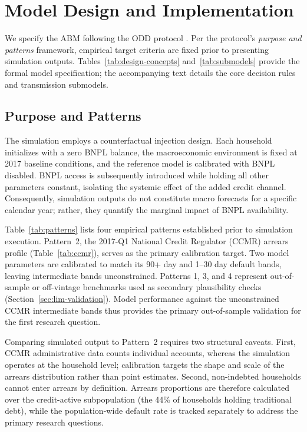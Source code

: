 \section{Model Design and Implementation}
\label{ch:model}

We specify the \ac{ABM} following the \ac{ODD} protocol \cite{grimm2006odd,
grimm2020odd}. Per the protocol's \emph{purpose and patterns} framework, empirical target criteria are fixed prior to presenting simulation outputs.
Tables~\ref{tab:design-concepts} and~\ref{tab:submodels} provide the formal model specification; the accompanying text details the core decision rules and transmission submodels.

\subsection{Purpose and Patterns}
\label{sec:purpose}

The simulation employs a counterfactual injection design.
Each household initializes with a zero \ac{BNPL} balance, the macroeconomic environment is fixed at 2017 baseline conditions, and the reference model is calibrated with \ac{BNPL} disabled.
\ac{BNPL} access is subsequently introduced while holding all other parameters constant, isolating the systemic effect of the added credit channel.
Consequently, simulation outputs do not constitute macro forecasts for a specific calendar year; rather, they quantify the marginal impact of \ac{BNPL} availability.

Table~\ref{tab:patterns} lists four empirical patterns established prior to simulation execution. Pattern~2, the 2017-Q1 National Credit Regulator (\ac{CCMR}) arrears profile (Table~\ref{tab:ccmr}), serves as the primary calibration target.
Two model parameters are calibrated to match its 90+ day and 1--30 day default bands, leaving intermediate bands unconstrained.
Patterns 1, 3, and 4 represent out-of-sample or off-vintage benchmarks used as secondary plausibility checks (Section~\ref{sec:lim-validation}).
Model performance against the unconstrained \ac{CCMR} intermediate bands thus provides the primary out-of-sample validation for the first research question.

Comparing simulated output to Pattern~2 requires two structural caveats.
First, \ac{CCMR} administrative data counts individual accounts, whereas the simulation operates at the household level; calibration targets the shape and scale of the arrears distribution rather than point estimates.
Second, non-indebted households cannot enter arrears by definition. Arrears proportions are therefore calculated over the credit-active subpopulation (the 44\% of households holding traditional debt), while the population-wide default rate is tracked separately to address the primary research questions.

